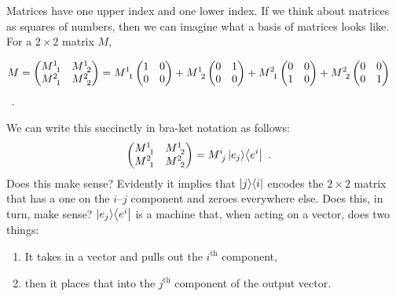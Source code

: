 Matrices have one upper index and one lower index. If we think about matrices as squares of numbers, then we can imagine what a basis of matrices looks like. For a $2\times 2$ matrix $M$,
\begin{wide}
 \begin{align}
        M=
     \begin{pmatrix}
         M\aij{1}{1} & M\aij{1}{2}\\
         M\aij{2}{1} & M\aij{2}{2}
     \end{pmatrix}
     &= 
     M\aij{1}{1} 
     \begin{pmatrix}
     1 & 0 \\
     0 & 0    
     \end{pmatrix}
     + M\aij{1}{2}
     \begin{pmatrix}
     0 & 1 \\
     0 & 0    
     \end{pmatrix}
     + M\aij{2}{1} 
     \begin{pmatrix}
     0 & 0 \\
     1 & 0    
     \end{pmatrix}
     + M\aij{2}{2}
     \begin{pmatrix}
     0 & 0 \\
     0 & 1    
     \end{pmatrix}
\end{align} \ .
\label{eq:M:2:2:basis:of:matrices:0}
\end{wide}
We can write this succinctly in bra-ket notation as follows:
\begin{align}
    \begin{pmatrix}
         M\aij{1}{1} & M\aij{1}{2}\\
         M\aij{2}{1} & M\aij{2}{2}
     \end{pmatrix}
     &= 
     M\aij{i}{j} \ket{e_j}\!\bra{e^i} \ .
     \label{eq:M:2:2:basis:of:matrices:1}
\end{align}
Does this make sense? Evidently it implies that $\left|j\right\rangle\!\left\langle i\right|$ encodes the $2\times 2$ matrix that has a one on the $i$--$j$ component and zeroes everywhere else.
% 
Does this, in turn, make sense? $\left|e_j\right\rangle\!\left\langle e^i\right|$ is a machine that, when acting on a vector, does two things:
\begin{enumerate}
    \item It takes in a vector and pulls out the $i^\text{th}$ component,
    \item then it places that into the $j^\text{th}$ component of the output vector.
\end{enumerate}
